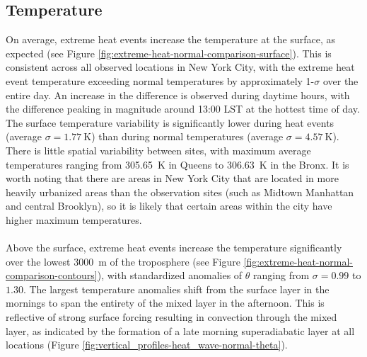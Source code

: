 \documentclass[11pt,a4paper]{article}
\begin{document}
\subsection{Temperature}
On average, extreme heat events increase the temperature at the surface, as expected (see Figure \ref{fig:extreme-heat-normal-comparison-surface}). This is consistent across all observed locations in New York City, with the extreme heat event temperature exceeding normal temperatures by approximately 1-$\sigma$ over the entire day. An increase in the difference is observed during daytime hours, with the difference peaking in magnitude around 13:00 LST at the hottest time of day. The surface temperature variability is significantly lower during heat events (average $ \sigma = \SI{1.77}{\kelvin} $) than during normal temperatures (average $ \sigma = \SI{4.57}{\kelvin} $). There is little spatial variability between sites, with maximum average temperatures ranging from \SI{305.65}{\kelvin} in Queens to \SI{306.63}{\kelvin} in the Bronx. It is worth noting that there are areas in New York City that are located in more heavily urbanized areas than the observation sites (such as Midtown Manhattan and central Brooklyn), so it is likely that certain areas within the city have higher maximum temperatures. 
\\ \\
Above the surface, extreme heat events increase the temperature significantly over the lowest \SI{3000}{\meter} of the troposphere (see Figure \ref{fig:extreme-heat-normal-comparison-contours}), with standardized anomalies of $\theta$ ranging from $\sigma = 0.99$ to $1.30$. The largest temperature anomalies shift from the surface layer in the mornings to span the entirety of the mixed layer in the afternoon. This is reflective of strong surface forcing resulting in convection through the mixed layer, as indicated by the formation of a late morning superadiabatic layer at all locations (Figure \ref{fig:vertical_profiles-heat_wave-normal-theta}). 
\\ \\
\end{document}
